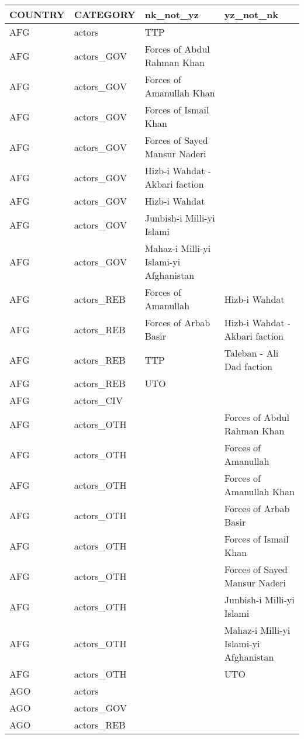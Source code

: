 \begin{table}[ht]
\centering
\begin{tabular}{llll}
  \hline
COUNTRY & CATEGORY & nk\_not\_yz & yz\_not\_nk \\ 
  \hline
AFG & actors & TTP &  \\ 
  AFG & actors\_GOV & Forces of Abdul Rahman Khan &  \\ 
  AFG & actors\_GOV & Forces of Amanullah Khan &  \\ 
  AFG & actors\_GOV & Forces of Ismail Khan &  \\ 
  AFG & actors\_GOV & Forces of Sayed Mansur Naderi &  \\ 
  AFG & actors\_GOV & Hizb-i Wahdat - Akbari faction &  \\ 
  AFG & actors\_GOV & Hizb-i Wahdat &  \\ 
  AFG & actors\_GOV & Junbish-i Milli-yi Islami &  \\ 
  AFG & actors\_GOV & Mahaz-i Milli-yi Islami-yi Afghanistan &  \\ 
  AFG & actors\_REB & Forces of Amanullah & Hizb-i Wahdat \\ 
  AFG & actors\_REB & Forces of Arbab Basir & Hizb-i Wahdat - Akbari faction \\ 
  AFG & actors\_REB & TTP & Taleban - Ali Dad faction \\ 
  AFG & actors\_REB & UTO &  \\ 
  AFG & actors\_CIV &  &  \\ 
  AFG & actors\_OTH &  & Forces of Abdul Rahman Khan \\ 
  AFG & actors\_OTH &  & Forces of Amanullah \\ 
  AFG & actors\_OTH &  & Forces of Amanullah Khan \\ 
  AFG & actors\_OTH &  & Forces of Arbab Basir \\ 
  AFG & actors\_OTH &  & Forces of Ismail Khan \\ 
  AFG & actors\_OTH &  & Forces of Sayed Mansur Naderi \\ 
  AFG & actors\_OTH &  & Junbish-i Milli-yi Islami \\ 
  AFG & actors\_OTH &  & Mahaz-i Milli-yi Islami-yi Afghanistan \\ 
  AFG & actors\_OTH &  & UTO \\ 
  AGO & actors &  &  \\ 
  AGO & actors\_GOV &  &  \\ 
  AGO & actors\_REB &  &  \\ 

\end{tabular}
\end{table}
